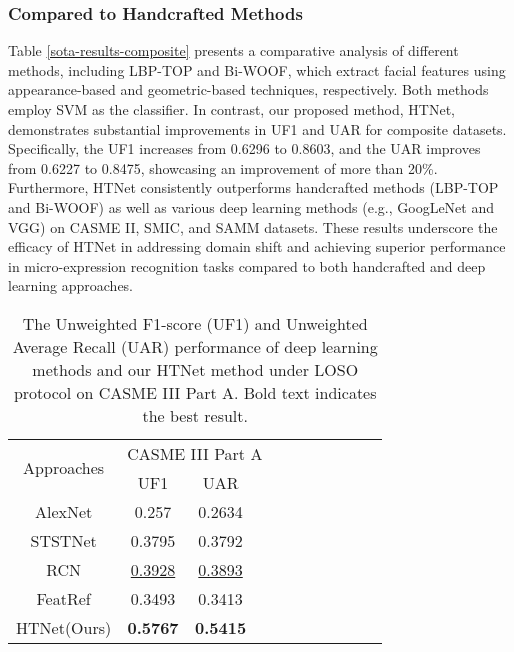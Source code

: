 \documentclass[review,12pt, 3p]{elsarticle}
\begin{document}
\subsubsection{Compared to Handcrafted  Methods}

Table \ref{sota-results-composite} presents a comparative analysis of different methods, including LBP-TOP and Bi-WOOF, which extract facial features using appearance-based and geometric-based techniques, respectively. Both methods employ SVM as the classifier. In contrast, our proposed method, HTNet, demonstrates substantial improvements in UF1 and UAR for composite datasets. Specifically, the UF1 increases from 0.6296 to 0.8603, and the UAR improves from 0.6227 to 0.8475, showcasing an improvement of more than 20\%. Furthermore, HTNet consistently outperforms handcrafted methods (LBP-TOP and Bi-WOOF) as well as various deep learning methods (e.g., GoogLeNet and VGG) on CASME II, SMIC, and SAMM datasets. These results underscore the efficacy of HTNet in addressing domain shift and achieving superior performance in micro-expression recognition tasks compared to both handcrafted and deep learning approaches.
\begin{table}[!t]
\centering
\small
\caption{ The Unweighted F1-score (UF1) and Unweighted Average Recall (UAR) performance of deep learning methods and our HTNet method under LOSO protocol on CASME III Part A. Bold text indicates the best result.}
\begin{tabular}{c c c c c c c c c c c   }
\hline
 \multirow{2}{*}{Approaches} &\multicolumn{3}{c}{CASME III Part A}\\
\cline{2-3} 
 &UF1 &UAR&  \\
\hline
AlexNet \cite{ref-11}  &0.257 & 0.2634 &  \\
STSTNet  \cite{ref-5}    &0.3795  & 0.3792  &  \\
RCN      \cite{ref-6}   &\underline{0.3928} &\underline{0.3893}& \\
FeatRef  \cite{ref-15}&0.3493 & 0.3413  & \\
HTNet(Ours) &\textbf{0.5767} & \textbf{0.5415}  &  \\
\hline
\end{tabular}
 \label{sota-results-part-A}
\end{table}
\end{document}

